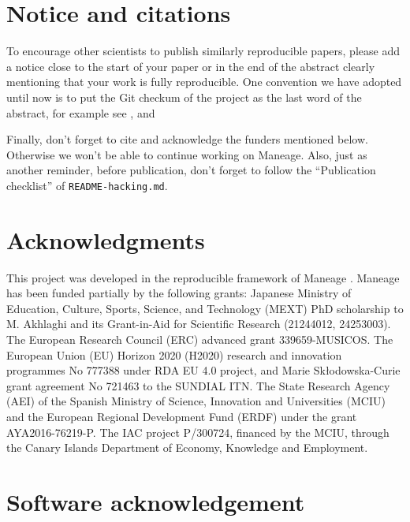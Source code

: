 \documentclass[10pt, twocolumn]{article}
\begin{document}
\section{Notice and citations}
To encourage other scientists to publish similarly reproducible papers,
please add a notice close to the start of your paper or in the end of the
abstract clearly mentioning that your work is fully reproducible. One
convention we have adopted until now is to put the Git checkum of the
project as the last word of the abstract, for example see
\citet{akhlaghi19}, \citet{infantesainz20} and \citet{maneage}

Finally, don't forget to cite \citet{maneage} and acknowledge the
funders mentioned below. Otherwise we won't be able to continue working on
Maneage. Also, just as another reminder, before publication, don't forget
to follow the ``Publication checklist'' of \texttt{README-hacking.md}.





\section{Acknowledgments}

This project was developed in the reproducible framework of Maneage
\citep[\emph{Man}aging data lin\emph{eage},][over commit
  \maneageversion]{maneage}. Maneage has been funded partially by the
following grants: Japanese Ministry of Education, Culture, Sports, Science,
and Technology (MEXT) PhD scholarship to M. Akhlaghi and its Grant-in-Aid
for Scientific Research (21244012, 24253003). The European Research Council
(ERC) advanced grant 339659-MUSICOS. The European Union (EU) Horizon 2020
(H2020) research and innovation programmes No 777388 under RDA EU 4.0
project, and Marie Sk\l{}odowska-Curie grant agreement No 721463 to the
SUNDIAL ITN. The State Research Agency (AEI) of the Spanish Ministry of
Science, Innovation and Universities (MCIU) and the European Regional
Development Fund (ERDF) under the grant AYA2016-76219-P. The IAC project
P/300724, financed by the MCIU, through the Canary Islands Department of
Economy, Knowledge and Employment.

\printbibliography

\appendix

\section{Software acknowledgement}


\end{document}
